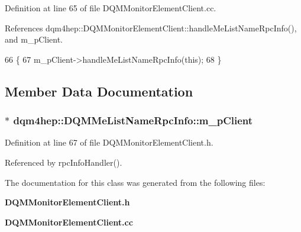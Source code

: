 Definition at line 65 of file D\+Q\+M\+Monitor\+Element\+Client.\+cc.



References dqm4hep\+::\+D\+Q\+M\+Monitor\+Element\+Client\+::handle\+Me\+List\+Name\+Rpc\+Info(), and m\+\_\+p\+Client.


\begin{DoxyCode}
66 \{
67   m_pClient->handleMeListNameRpcInfo(\textcolor{keyword}{this});
68 \}
\end{DoxyCode}


\subsection{Member Data Documentation}
\subsubsection[{m\+\_\+p\+Client}]{$\ast$ dqm4hep\+::\+D\+Q\+M\+Me\+List\+Name\+Rpc\+Info\+::m\+\_\+p\+Client\hspace{0.3cm}{\ttfamily [private]}}\label{classdqm4hep_1_1DQMMeListNameRpcInfo_a03d611ceb0f11bc2adf3911990cb464d}


Definition at line 67 of file D\+Q\+M\+Monitor\+Element\+Client.\+h.



Referenced by rpc\+Info\+Handler().



The documentation for this class was generated from the following files\+:\begin{DoxyCompactItemize}
\item 
{\bf D\+Q\+M\+Monitor\+Element\+Client.\+h}\item 
{\bf D\+Q\+M\+Monitor\+Element\+Client.\+cc}\end{DoxyCompactItemize}
